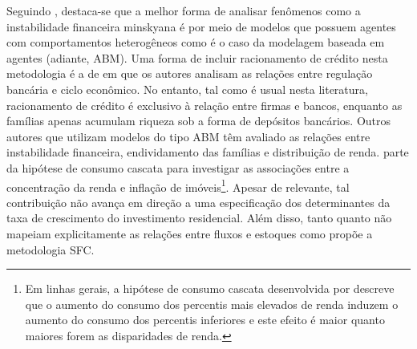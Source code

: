 Seguindo \textcite{bellofiore_minskys_2001}, destaca-se que a melhor forma de analisar fenômenos como a instabilidade financeira minskyana é por meio de modelos que possuem agentes com comportamentos heterogêneos como é o caso da modelagem baseada em agentes (adiante, ABM).
Uma forma de incluir racionamento de crédito nesta metodologia é a de \textcite{dawid_bubbles_2015} em que os autores analisam as relações entre regulação bancária e ciclo econômico.
No entanto, tal como é usual nesta literatura, racionamento de crédito é exclusivo à relação entre firmas e bancos, enquanto as famílias apenas acumulam riqueza sob a forma de depósitos bancários.
Outros autores que utilizam modelos do tipo ABM têm avaliado as relações entre instabilidade financeira, endividamento das famílias e distribuição de renda.
\textcite{cardaci_inequality_2018} parte da hipótese de consumo cascata para investigar as associações entre a concentração da renda e inflação de imóveis\footnote{
    Em linhas gerais, a hipótese de consumo cascata desenvolvida por \textcite{duesenberry_income_1949} descreve que o aumento do consumo dos percentis mais elevados de renda induzem o aumento do consumo dos percentis inferiores e este efeito é maior quanto maiores forem as disparidades de renda. %
}.
Apesar de relevante, tal contribuição não avança em direção a uma especificação dos determinantes da taxa de crescimento do investimento residencial.
Além disso, tanto \textcite{dawid_bubbles_2015} quanto \textcite{cardaci_inequality_2018} não mapeiam explicitamente as relações entre fluxos e estoques como propõe a metodologia SFC.


